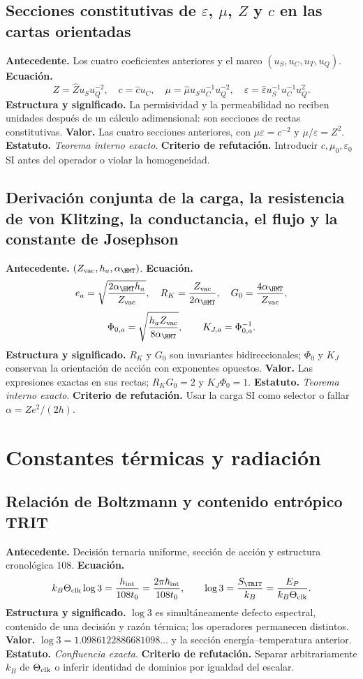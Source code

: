 \subsection*{Secciones constitutivas de \(\varepsilon\), \(\mu\), \(Z\) y \(c\) en las cartas orientadas}
\textbf{Antecedente.} Los cuatro coeficientes anteriores y el marco
\((u_S,u_C,u_T,u_Q)\). \textbf{Ecuaci\'on.}
\[
Z=\widehat Zu_Su_Q^{-2},\quad c=\widehat cu_C,\quad
\mu=\widehat\mu u_Su_C^{-1}u_Q^{-2},\quad
\varepsilon=\widehat\varepsilon u_S^{-1}u_C^{-1}u_Q^2.
\]
\textbf{Estructura y significado.} La permisividad y la permeabilidad no
reciben unidades despu\'es de un c\'alculo adimensional: son secciones de rectas
constitutivas. \textbf{Valor.} Las cuatro secciones anteriores, con
\(\mu\varepsilon=c^{-2}\) y \(\mu/\varepsilon=Z^2\).
\textbf{Estatuto.} \emph{Teorema interno exacto}. \textbf{Criterio de refutación.} Introducir
\(c,\mu_0,\varepsilon_0\) SI antes del operador o violar la homogeneidad.

\subsection*{Derivación conjunta de la carga, la resistencia de von Klitzing, la conductancia, el flujo y la constante de Josephson}
\textbf{Antecedente.} \((Z_{\rm vac},h_a,\alpha_{\HMT})\).
\textbf{Ecuaci\'on.}
\[
e_a=\sqrt{\frac{2\alpha_{\HMT}h_a}{Z_{\rm vac}}},\quad
R_K=\frac{Z_{\rm vac}}{2\alpha_{\HMT}},\quad
G_0=\frac{4\alpha_{\HMT}}{Z_{\rm vac}},
\]
\[
\Phi_{0,a}=\sqrt{\frac{h_aZ_{\rm vac}}{8\alpha_{\HMT}}},
\qquad K_{J,a}=\Phi_{0,a}^{-1}.
\]
\textbf{Estructura y significado.} \(R_K\) y \(G_0\) son invariantes
bidireccionales; \(\Phi_0\) y \(K_J\) conservan la orientaci\'on de acci\'on con
exponentes opuestos. \textbf{Valor.} Las expresiones exactas en sus rectas;
\(R_KG_0=2\) y \(K_J\Phi_0=1\). \textbf{Estatuto.}
\emph{Teorema interno exacto}. \textbf{Criterio de refutación.} Usar la carga SI como selector o
fallar \(\alpha=Ze^2/(2h)\).

\section{Constantes t\'ermicas y radiaci\'on}

\subsection*{Relaci\'on de Boltzmann y contenido entr\'opico TRIT }
\textbf{Antecedente.} Decisi\'on ternaria uniforme, secci\'on de acci\'on y
estructura cronol\'ogica \(108\). \textbf{Ecuaci\'on.}
\[
k_B\Theta_{\rm clk}\log3=\frac{h_{\rm int}}{108t_0}
=\frac{2\pi\hbar_{\rm int}}{108t_0},
\qquad
\log3=\frac{S_{\TRIT}}{k_B}=\frac{E_P}{k_B\Theta_{\rm clk}}.
\]
\textbf{Estructura y significado.} \(\log3\) es simult\'aneamente defecto
espectral, contenido de una decisi\'on y raz\'on t\'ermica; los operadores
permanecen
distintos. \textbf{Valor.} \(\log3=1.0986122886681098\ldots\) y la secci\'on
energ\'ia--temperatura anterior. \textbf{Estatuto.} \emph{Confluencia
exacta}. \textbf{Criterio de refutación.} Separar arbitrariamente \(k_B\) de
\(\Theta_{\rm clk}\) o inferir identidad de dominios por igualdad del escalar.

